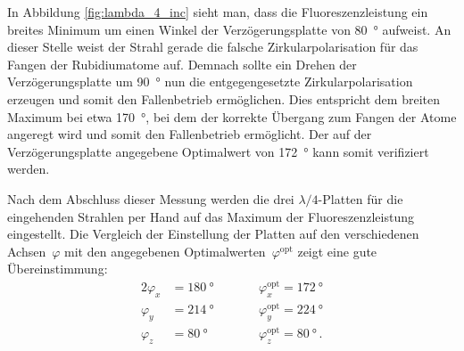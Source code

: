 \documentclass[11pt, a4paper]{article}
\numberwithin{equation}{section}
\begin{document}
In Abbildung \ref{fig:lambda_4_inc} sieht man, dass die Fluoreszenzleistung ein breites Minimum um einen Winkel der Verzögerungsplatte von \SI{80}{\degree} aufweist.
An dieser Stelle weist der Strahl gerade die falsche Zirkularpolarisation für das Fangen der Rubidiumatome auf.
Demnach sollte ein Drehen der Verzögerungsplatte um \SI{90}{\degree} nun die entgegengesetzte Zirkularpolarisation erzeugen und somit den Fallenbetrieb ermöglichen.
Dies entspricht dem breiten Maximum bei etwa \SI{170}{\degree}, bei dem der korrekte Übergang zum Fangen der Atome angeregt wird und somit den Fallenbetrieb ermöglicht.
Der auf der Verzögerungsplatte angegebene Optimalwert von \SI{172}{\degree} kann somit verifiziert werden.

Nach dem Abschluss dieser Messung werden die drei $\lambda / 4$-Platten für die eingehenden Strahlen per Hand auf das Maximum der Fluoreszenzleistung eingestellt.
Die Vergleich der Einstellung der Platten auf den verschiedenen Achsen~$\varphi$ mit den angegebenen Optimalwerten~$\varphi^\mathrm{opt}$ zeigt eine gute Übereinstimmung:
\begin{alignat*}{2}
	\varphi_x &= \SI{180}{\degree} \qquad &&\varphi_x^\mathrm{opt} = \SI{172}{\degree}\\
	\varphi_y &= \SI{214}{\degree} \qquad &&\varphi_y^\mathrm{opt} = \SI{224}{\degree}\\
	\varphi_z &= \SI{80}{\degree} \qquad &&\varphi_z^\mathrm{opt} = \SI{80}{\degree} \, \text{.}
\end{alignat*}
\end{document}
